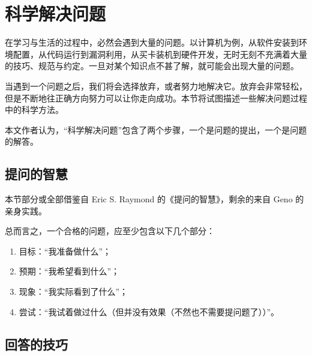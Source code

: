 \section{科学解决问题}\label{sec:Preclass/SolvingQuestions}
    在学习与生活的过程中，必然会遇到大量的问题。以计算机为例，从软件安装到环境配置，从代码运行到漏洞利用，从买卡装机到硬件开发，无时无刻不充满着大量的技巧、规范与约定。一旦对某个知识点不甚了解，就可能会出现大量的问题。

    当遇到一个问题之后，我们将会选择放弃，或者努力地解决它。放弃会非常轻松，但是不断地往正确方向努力可以让你走向成功。本节将试图描述一些解决问题过程中的科学方法。

    本文作者认为，“科学解决问题”包含了两个步骤，一个是问题的提出，一个是问题的解答。

    \subsection{提问的智慧}\label{subsec:solving/asking}
        本节部分或全部借鉴自 Eric S. Raymond 的《提问的智慧》\cite{esr}，剩余的来自 Geno 的亲身实践。

        总而言之，一个合格的问题，应至少包含以下几个部分：
        \begin{enumerate}
            \item 目标：“我准备做什么”；
            \item 预期：“我希望看到什么”；
            \item 现象：“我实际看到了什么”；
            \item 尝试：“我试着做过什么（但并没有效果（不然也不需要提问题了））”。
        \end{enumerate}

    \subsection{回答的技巧}\label{subsec:solving/answering}
